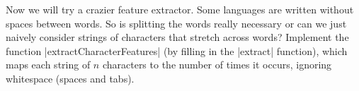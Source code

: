 \item {}

Now we will try a crazier feature extractor.  Some languages are written without
spaces between words. So is splitting the words really necessary or can we just
naively consider strings of characters that stretch across words? Implement the
function |extractCharacterFeatures| (by filling in the |extract|
function), which maps each string of $n$ characters to the number of times it
occurs, ignoring whitespace (spaces and tabs).
